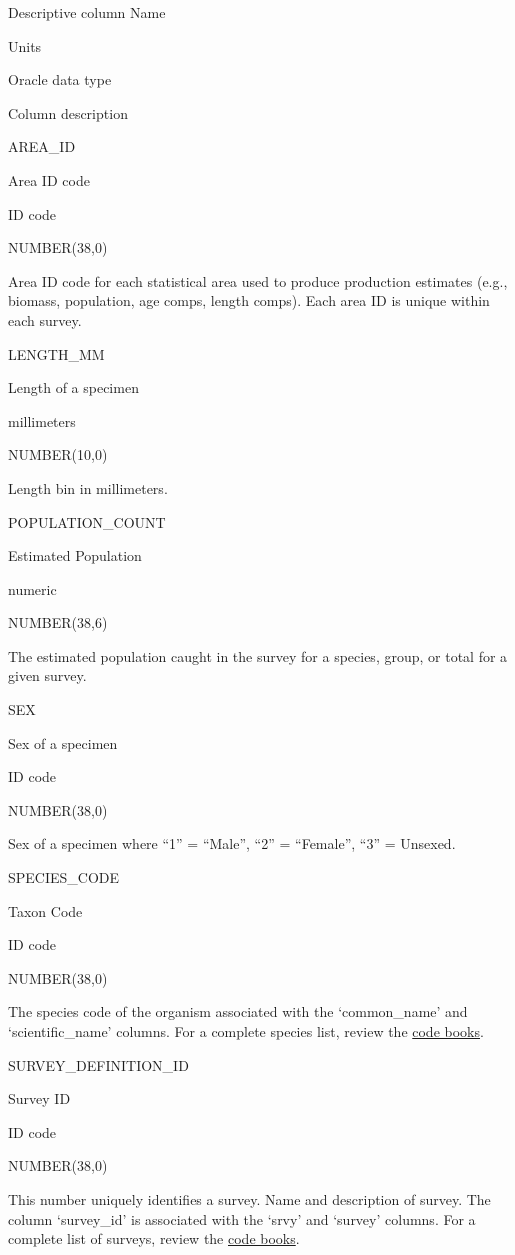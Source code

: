 \documentclass[
  letterpaper,
  oneside,
  open=any]{scrbook}
\begin{document}
Descriptive column Name

Units

Oracle data type

Column description

AREA\_ID

Area ID code

ID code

NUMBER(38,0)

Area ID code for each statistical area used to produce production
estimates (e.g., biomass, population, age comps, length comps). Each
area ID is unique within each survey.

LENGTH\_MM

Length of a specimen

millimeters

NUMBER(10,0)

Length bin in millimeters.

POPULATION\_COUNT

Estimated Population

numeric

NUMBER(38,6)

The estimated population caught in the survey for a species, group, or
total for a given survey.

SEX

Sex of a specimen

ID code

NUMBER(38,0)

Sex of a specimen where ``1'' = ``Male'', ``2'' = ``Female'', ``3'' =
Unsexed.

SPECIES\_CODE

Taxon Code

ID code

NUMBER(38,0)

The species code of the organism associated with the `common\_name' and
`scientific\_name' columns. For a complete species list, review the
\href{https://www.fisheries.noaa.gov/resource/document/groundfish-survey-species-code-manual-and-data-codes-manual}{code
books}.

SURVEY\_DEFINITION\_ID

Survey ID

ID code

NUMBER(38,0)

This number uniquely identifies a survey. Name and description of
survey. The column `survey\_id' is associated with the `srvy' and
`survey' columns. For a complete list of surveys, review the
\href{https://www.fisheries.noaa.gov/resource/document/groundfish-survey-species-code-manual-and-data-codes-manual}{code
books}.
\end{document}
